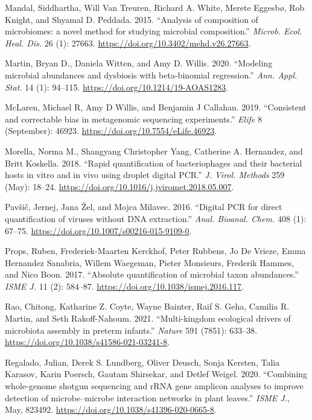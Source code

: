 \documentclass[
]{article}
\newlength{\cslhangindent}
\newlength{\cslentryspacingunit} %
\newenvironment{CSLReferences}[2] %
 {%
  \setlength{\parindent}{0pt}
  \ifodd #1
  \let\oldpar\par
  \def\par{\hangindent=\cslhangindent\oldpar}
  \fi
  \setlength{\parskip}{#2\cslentryspacingunit}
 }%
 {}
\begin{document}
\begin{CSLReferences}{1}{0}
\leavevmode{}%
Mandal, Siddhartha, Will Van Treuren, Richard A. White, Merete Eggesbø, Rob Knight, and Shyamal D. Peddada. 2015. {``{Analysis of composition of microbiomes: a novel method for studying microbial composition}.''} \emph{Microb. Ecol. Heal. Dis.} 26 (1): 27663. \url{https://doi.org/10.3402/mehd.v26.27663}.

\leavevmode{}%
Martin, Bryan D., Daniela Witten, and Amy D. Willis. 2020. {``{Modeling microbial abundances and dysbiosis with beta-binomial regression}.''} \emph{Ann. Appl. Stat.} 14 (1): 94--115. \url{https://doi.org/10.1214/19-AOAS1283}.

\leavevmode{}%
McLaren, Michael R, Amy D Willis, and Benjamin J Callahan. 2019. {``{Consistent and correctable bias in metagenomic sequencing experiments}.''} \emph{Elife} 8 (September): 46923. \url{https://doi.org/10.7554/eLife.46923}.

\leavevmode{}%
Morella, Norma M., Shangyang Christopher Yang, Catherine A. Hernandez, and Britt Koskella. 2018. {``{Rapid quantification of bacteriophages and their bacterial hosts in vitro and in vivo using droplet digital PCR}.''} \emph{J. Virol. Methods} 259 (May): 18--24. \url{https://doi.org/10.1016/j.jviromet.2018.05.007}.

\leavevmode{}%
Pavšič, Jernej, Jana Žel, and Mojca Milavec. 2016. {``{Digital PCR for direct quantification of viruses without DNA extraction}.''} \emph{Anal. Bioanal. Chem.} 408 (1): 67--75. \url{https://doi.org/10.1007/s00216-015-9109-0}.

\leavevmode{}%
Props, Ruben, Frederiek-Maarten Kerckhof, Peter Rubbens, Jo De Vrieze, Emma Hernandez Sanabria, Willem Waegeman, Pieter Monsieurs, Frederik Hammes, and Nico Boon. 2017. {``{Absolute quantification of microbial taxon abundances}.''} \emph{ISME J.} 11 (2): 584--87. \url{https://doi.org/10.1038/ismej.2016.117}.

\leavevmode{}%
Rao, Chitong, Katharine Z. Coyte, Wayne Bainter, Raif S. Geha, Camilia R. Martin, and Seth Rakoff-Nahoum. 2021. {``{Multi-kingdom ecological drivers of microbiota assembly in preterm infants}.''} \emph{Nature} 591 (7851): 633--38. \url{https://doi.org/10.1038/s41586-021-03241-8}.

\leavevmode{}%
Regalado, Julian, Derek S. Lundberg, Oliver Deusch, Sonja Kersten, Talia Karasov, Karin Poersch, Gautam Shirsekar, and Detlef Weigel. 2020. {``{Combining whole-genome shotgun sequencing and rRNA gene amplicon analyses to improve detection of microbe--microbe interaction networks in plant leaves}.''} \emph{ISME J.}, May, 823492. \url{https://doi.org/10.1038/s41396-020-0665-8}.


\end{CSLReferences}
\end{document}
